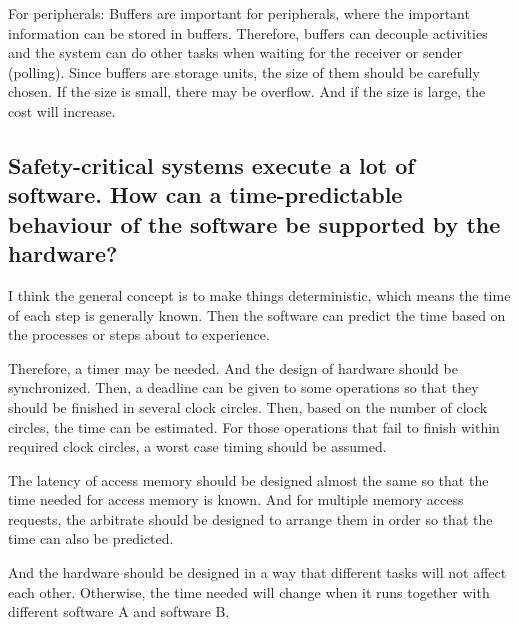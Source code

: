 \documentclass[10pt]{article}
\begin{document}
For peripherals: Buffers are important for peripherals, where the important information can be stored in buffers. Therefore, buffers can decouple activities and the system can do other tasks when waiting for the receiver or sender (polling). Since buffers are storage units, the size of them should be carefully chosen. If the size is small, there may be overflow. And if the size is large, the cost will increase.

\subsection{Safety-critical systems execute a lot of software. How can a time-predictable behaviour of the software be supported by the hardware?}

I think the general concept is to make things deterministic, which means the time of each step is generally known. Then the software can predict the time based on the processes or steps about to experience. 

Therefore, a timer may be needed. And the design of hardware should be synchronized. Then, a deadline can be given to some operations so that they should be finished in several clock circles. Then, based on the number of clock circles, the time can be estimated. For those operations that fail to finish within required clock circles, a worst case timing should be assumed.

The latency of access memory should be designed almost the same so that the time needed for access memory is known. And for multiple memory access requests, the arbitrate should be designed to arrange them in order so that the time can also be predicted. 

And the hardware should be designed in a way that different tasks will not affect each other. Otherwise, the time needed will change when it runs together with different software A and software B.
\end{document}
